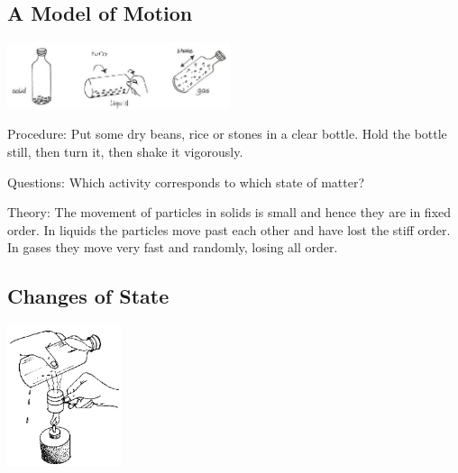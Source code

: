 \begin{multicols}{2}
\subsection{A Model of Motion}

\begin{center}
\includegraphics[width=0.49\textwidth]{./img/vso/motion-model.png}
\end{center}

\begin{description*}
\item[Procedure:]{Put some dry beans, rice or stones in a clear bottle. Hold the bottle still, then turn it, then shake it vigorously.}
\item[Questions:]{Which activity corresponds to which state of matter?}
\item[Theory:]{The movement of particles in solids is small and hence they are in fixed order. In liquids the particles move past each other and have lost the stiff order. In gases they move very fast and randomly, losing all order.}
\end{description*}

\subsection{Changes of State}

\begin{center}
\includegraphics[width=0.25\textwidth]{./img/source/change-state.png}
\end{center}


\end{multicols}
